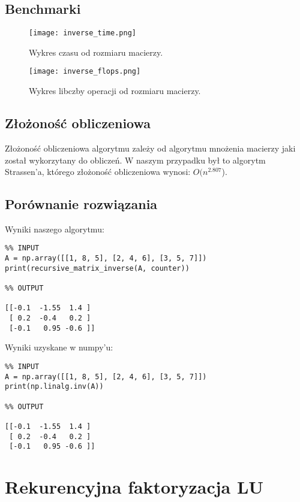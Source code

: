\documentclass{article}
\begin{document}
\subsection{Benchmarki}

\begin{center}
\begin{figure}[H]
  \texttt{[image: inverse\_time.png]}
  \caption{Wykres czasu od rozmiaru macierzy.}
\end{figure}

\begin{figure}[H]
  \texttt{[image: inverse\_flops.png]}
  \caption{Wykres libczby operacji od rozmiaru macierzy.}
\end{figure}
\end{center}

\subsection{Złożoność obliczeniowa}
\qquad Złożoność obliczeniowa algorytmu zależy od algorytmu mnożenia macierzy jaki został wykorzytany do obliczeń. W naszym przypadku był to algorytm Strassen'a, którego złożoność obliczeniowa wynosi: $O(n^{2.807}$).
\subsection{Porównanie rozwiązania}

Wyniki naszego algorytmu: \\
\begin{lstlisting}
%% INPUT
A = np.array([[1, 8, 5], [2, 4, 6], [3, 5, 7]])
print(recursive_matrix_inverse(A, counter))

%% OUTPUT

[[-0.1  -1.55  1.4 ]
 [ 0.2  -0.4   0.2 ]
 [-0.1   0.95 -0.6 ]]
\end{lstlisting} 
\newline
Wyniki uzyskane w numpy'u: \\

\begin{lstlisting}
%% INPUT
A = np.array([[1, 8, 5], [2, 4, 6], [3, 5, 7]])
print(np.linalg.inv(A))

%% OUTPUT

[[-0.1  -1.55  1.4 ]
 [ 0.2  -0.4   0.2 ]
 [-0.1   0.95 -0.6 ]]
\end{lstlisting}

\section{Rekurencyjna faktoryzacja LU}
\end{document}
